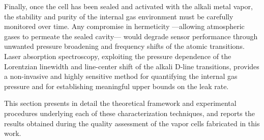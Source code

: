Finally, once the cell has been sealed and activated with the alkali 
metal vapor, the stability and purity of the internal gas environment 
must be carefully monitored over time. Any compromise in 
hermeticity ---allowing atmospheric gases to permeate the sealed 
cavity--- would degrade sensor performance through unwanted pressure 
broadening and frequency shifts of the atomic transitions. Laser 
absorption spectroscopy, exploiting the pressure dependence of the 
Lorentzian linewidth and line-center shift of the alkali D-line 
transitions, provides a non-invasive and highly sensitive method for 
quantifying the internal gas pressure and for establishing meaningful 
upper bounds on the leak rate.

This section presents in detail the theoretical framework and 
experimental procedures underlying each of these characterization 
techniques, and reports the results obtained during the quality 
assessment of the vapor cells fabricated in this work.